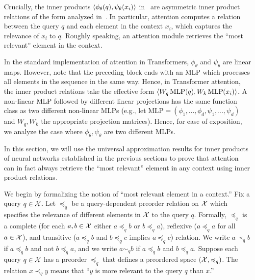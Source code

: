 Crucially, the inner products $\left \langle \phi_\theta(q), \psi_\theta(x_i) \right\rangle$ in~ are asymmetric inner product relations of the form analyzed in~. In particular, attention computes a relation between the query $q$ and each element in the context $x_i$, which captures the relevance of $x_i$ to $q$. Roughly speaking, an attention module retrieves the ``most relevant'' element in the context.

\begin{remark}
    In the standard implementation of attention in Transformers, $\phi_\theta$ and $\psi_\theta$ are linear maps. However, note that the preceding block ends with an MLP which processes all elements in the sequence in the same way. Hence, in Transformer attention, the inner product relations take the effective form $\langle W_q \, \mathrm{MLP}(q), W_k \, \mathrm{MLP}(x_i) \rangle$. A non-linear MLP followed by different linear projections has the same function class as two different non-linear MLPs (e.g., let $\mathrm{MLP} = (\phi_1, \ldots, \phi_d, \psi_1, \ldots, \psi_d)$ and $W_q, W_k$ the appropriate projection matrices). Hence, for ease of exposition, we analyze the case where $\phi_\theta, \psi_\theta$ are two different MLPs.
\end{remark}

In this section, we will use the universal approximation results for inner products of neural networks established in the previous sections to prove that attention can in fact always retrieve the ``most relevant'' element in any context using inner product relations.

We begin by formalizing the notion of ``most relevant element in a context.'' Fix a query $q \in {\mathcal{X}}$. Let $\preceq_q$ be a query-dependent preorder relation on ${\mathcal{X}}$ which specifies the relevance of different elements in ${\mathcal{X}}$ to the query $q$. Formally, $\preceq_q$ is a complete (for each $a,b \in {\mathcal{X}}$ either $a \preceq_q b$ or $b \preceq_q a$), reflexive ($a \preceq_q a$ for all $a \in {\mathcal{X}}$), and transitive ($a \preceq_q b$ and $b \preceq_q c$ implies $a \preceq_q c$) relation.  We write $a \prec_q b$ if $a \preceq_q b$ and not $b \preceq_q a$, and we write $a \sim_q b$ if $a \preceq_q b$ and $b \preceq_q a$. Suppose each query $q \in {\mathcal{X}}$ has a preorder $\preceq_q$ that defines a preordered space $({\mathcal{X}}, \preccurlyeq_q)$. The relation $x \prec_q y$ means that ``$y$ is more relevant to the query $q$ than $x$.''

